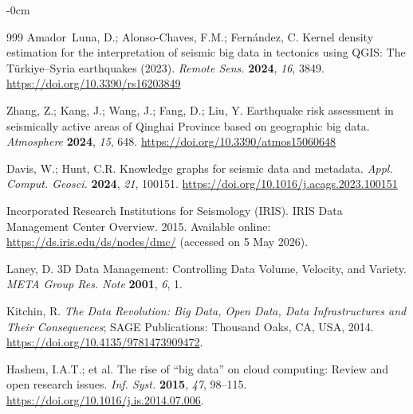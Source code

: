 \documentclass[data,article,accept,pdftex,moreauthors]{Definitions/mdpi}
\begin{document}
\begin{adjustwidth}{-\extralength}{0cm}
\begin{thebibliography}{999}
Amador~Luna, D.; Alonso-Chaves, F.M.; Fern{\'a}ndez, C. Kernel density estimation for the interpretation of seismic big data in tectonics using QGIS: The T\"{u}rkiye--Syria earthquakes (2023). \emph{Remote Sens.} \textbf{2024}, \emph{16}, 3849. \url{https://doi.org/10.3390/rs16203849}

Zhang, Z.; Kang, J.; Wang, J.; Fang, D.; Liu, Y. Earthquake risk assessment in seismically active areas of Qinghai Province based on geographic big data. \emph{Atmosphere} \textbf{2024}, \emph{15}, 648. \url{https://doi.org/10.3390/atmos15060648}

Davis, W.; Hunt, C.R. Knowledge graphs for seismic data and metadata. \emph{Appl. Comput. Geosci.} \textbf{2024}, \emph{21}, 100151. \url{https://doi.org/10.1016/j.acags.2023.100151}

Incorporated Research Institutions for Seismology (IRIS). IRIS Data Management Center Overview. 2015. Available online: \url{https://ds.iris.edu/ds/nodes/dmc/} (accessed on 5 May 2026).

Laney, D. 3D Data Management: Controlling Data Volume, Velocity, and Variety. \emph{META Group Res. Note} \textbf{2001}, \emph{6}, 1. %

Kitchin, R. \emph{The Data Revolution: Big Data, Open Data, Data Infrastructures and Their Consequences}; SAGE Publications: Thousand Oaks, CA, USA, %
 2014. \url{https://doi.org/10.4135/9781473909472}.

Hashem, I.A.T.; et al. The rise of ``big data'' on cloud computing: Review and open research issues. \emph{Inf. Syst.} \textbf{2015}, \emph{47}, 98--115. \url{https://doi.org/10.1016/j.is.2014.07.006}. %


\end{thebibliography}
\end{adjustwidth}
\end{document}

